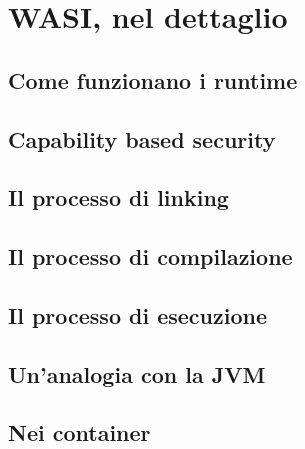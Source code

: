 \chapter{WASI, nel dettaglio}
\label{chap:wasi-in-depth}

\section{Come funzionano i runtime}
\section{Capability based security}
\section{Il processo di linking}
\section{Il processo di compilazione}
\section{Il processo di esecuzione}
\section{Un'analogia con la JVM}
\section{Nei container}